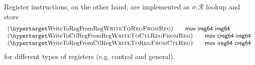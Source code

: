   Register instructions, on the other hand, are implemented as $\sigma.\mathcal{R}$ lookup and store
\[
\begin{array}{l}
  \hbox{(\TirNameStyle{WriteToRegFromReg})} \qquad 
   \textsf{mov ireg64 ireg64} \\
  \hbox{(\TirNameStyle{WriteToCtlRegFromReg})} \qquad 
  \textsf{mov creg64 ireg64}\\
    \hbox{(\TirNameStyle{WriteToRegFromCtlReg})} \qquad 
  \textsf{mov ireg64 creg64}
  \end{array}
\]
for different types of registers (e.g. control and general).
%
